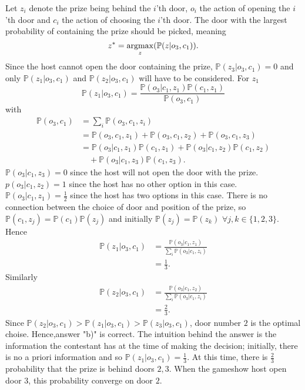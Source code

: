 \begin{example}
	Let $z_i$ denote the prize being behind the $i$'th door, $o_i$ the action of opening the $i$'th door and $c_i$ the action of choosing the $i$'th door. The door with the largest probability of containing the prize should be picked, meaning
	\begin{equation}
		z^*=\operatorname*{argmax}_z(\mathbb{P}(z|o_3,c_1)).
	\end{equation}
	Since the host cannot open the door containing the prize, $\mathbb{P}(z_3|o_3,c_1)=0$ and only $\mathbb{P}(z_1|o_3,c_1)$ and $\mathbb{P}(z_2|o_3,c_1)$ will have to be considered. For $z_1$
	\begin{equation}
		\mathbb{P}(z_1|o_3,c_1) = \frac{\mathbb{P}(o_3|c_1,z_1)\mathbb{P}(c_1,z_1)}{\mathbb{P}(o_3,c_1)}
	\end{equation}
	with
	\begin{equation}
		\begin{split}
			\mathbb{P}(o_3,c_1)&=\sum_i\mathbb{P}(o_3,c_1,z_i)\\
			&=\mathbb{P}(o_3,c_1,z_1)+\mathbb{P}(o_3,c_1,z_2)+\mathbb{P}(o_3,c_1,z_3)\\
			&= \mathbb{P}(o_3|c_1,z_1)\mathbb{P}(c_1,z_1)+\mathbb{P}(o_3|c_1,z_2)\mathbb{P}(c_1,z_2)\\
			&\quad+\mathbb{P}(o_3|c_1,z_3)\mathbb{P}(c_1,z_3).
		\end{split}
	\end{equation}
	$\mathbb{P}(o_3|c_1,z_3)=0$ since the host will not open the door with the prize. $p(o_3|c_1,z_2)=1$ since the host has no other option in this case. $\mathbb{P}(o_3|c_1,z_1)=\frac{1}{2}$ since the host has two options in this case. There is no connection between the choice of door and position of the prize, so $\mathbb{P}(c_1, z_j)=\mathbb{P}(c_1)\mathbb{P}(z_j)$ and initially $\mathbb{P}(z_j)=\mathbb{P}(z_k)$ $\forall j,k\in \{1,2,3\}$. Hence
	\begin{equation}
		\begin{split}
			\mathbb{P}(z_1|o_3,c_1) &= \frac{\mathbb{P}(o_3|c_1,z_1)}{\sum_i\mathbb{P}(o_3|c_1,z_i)}\\
			&=\frac{1}{3}.
		\end{split}
	\end{equation}
	Similarly
	\begin{equation}
		\begin{split}
			\mathbb{P}(z_2|o_3,c_1) &= \frac{\mathbb{P}(o_3|c_1,z_2)}{\sum_i\mathbb{P}(o_3|c_1,z_i)}\\
			&=\frac{2}{3}.
		\end{split}
	\end{equation}
	Since $\mathbb{P}(z_2|o_3,c_1)>\mathbb{P}(z_1|o_3,c_1)>\mathbb{P}(z_3|o_3,c_1)$, door number $2$ is the optimal choise. Hence,answer "b)" is correct. The intuition behind the answer is the information the contestant has at the time of making the decision; initially, there is no a priori information and so $\mathbb{P}(z_1|o_3,c_1)=\frac{1}{3}$. At this time, there is $\frac{2}{3}$ probability that the prize is behind doors $2,3$. When the gameshow host open door $3$, this probability converge on door $2$.
\end{example}

